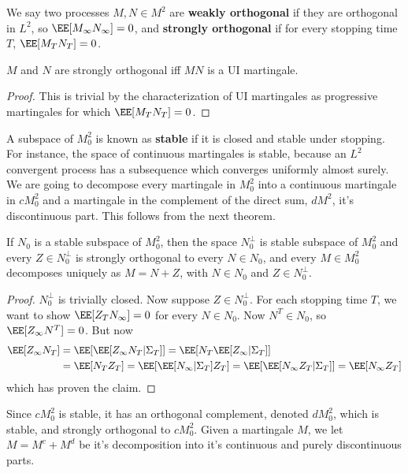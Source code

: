 We say two processes $M,N \in M^2$ are {\bf weakly orthogonal} if they are orthogonal in $L^2$, so $\EE[M_\infty N_\infty] = 0$, and {\bf strongly orthogonal} if for every stopping time $T$, $\EE[M_T N_T] = 0$.

\begin{lemma}
    $M$ and $N$ are strongly orthogonal iff $MN$ is a UI martingale.
\end{lemma}
\begin{proof}
    This is trivial by the characterization of UI martingales as progressive martingales for which $\EE[M_T N_T] = 0$.
\end{proof}

A subspace of $M^2_0$ is known as {\bf stable} if it is closed and stable under stopping. For instance, the space of continuous martingales is stable, because an $L^2$ convergent process has a subsequence which converges uniformly almost surely. We are going to decompose every martingale in $M^2_0$ into a continuous martingale in $cM^2_0$ and a martingale in the complement of the direct sum, $dM^2$, it's discontinuous part. This follows from the next theorem.

\begin{theorem}
    If $N_0$ is a stable subspace of $M^2_0$, then the space $N_0^\perp$ is stable subspace of $M^2_0$ and every $Z \in N_0^\perp$ is strongly orthogonal to every $N \in N_0$, and every $M \in M_0^2$ decomposes uniquely as $M = N + Z$, with $N \in N_0$ and $Z \in N_0^\perp$.
\end{theorem}
\begin{proof}
    $N_0^\perp$ is trivially closed. Now suppose $Z \in N_0^\perp$. For each stopping time $T$, we want to show $\EE[Z_T N_\infty] = 0$ for every $N \in N_0$. Now $N^T \in N_0$, so $\EE[Z_\infty N^T] = 0$. But now
    \begin{align*}
        \EE[Z_\infty N_T] &= \EE[\EE[Z_\infty N_T|\Sigma_T]] = \EE[N_T \EE[Z_\infty | \Sigma_T]]\\
        &= \EE[N_TZ_T] = \EE[\EE[N_\infty | \Sigma_T] Z_T] = \EE[\EE[N_\infty Z_T | \Sigma_T]] = \EE[N_\infty Z_T]
    \end{align*}
    which has proven the claim.
\end{proof}

Since $cM^2_0$ is stable, it has an orthogonal complement, denoted $dM^2_0$, which is stable, and strongly orthogonal to $cM^2_0$. Given a martingale $M$, we let $M = M^c + M^d$ be it's decomposition into it's continuous and purely discontinuous parts.

